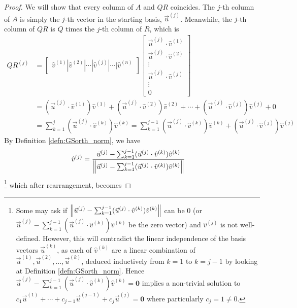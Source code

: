 \begin{proof}
We will show that every column of $A$ and $QR$ coincides. The $j$-th column of $A$ is simply the $j$-th vector in the starting basis, $\vec{u}^{(j)}$. Meanwhile, the $j$-th column of $QR$ is $Q$ times the $j$-th column of $R$, which is
\begin{align*}
QR^{(j)} &=
\begin{bmatrix}
\hat{v}^{(1)}|\hat{v}^{(2)}|\cdots|\hat{v}^{(j)}|\cdots|\hat{v}^{(n)}   
\end{bmatrix}
\begin{bmatrix}
\vec{u}^{(j)} \cdot \hat{v}^{(1)} \\   
\vec{u}^{(j)} \cdot \hat{v}^{(2)} \\   
\vdots \\
\vec{u}^{(j)} \cdot \hat{v}^{(j)} \\
\vdots \\
0
\end{bmatrix} \\
&= (\vec{u}^{(j)} \cdot \hat{v}^{(1)}) \hat{v}^{(1)} + (\vec{u}^{(j)} \cdot \hat{v}^{(2)}) \hat{v}^{(2)} + \cdots + (\vec{u}^{(j)} \cdot \hat{v}^{(j)}) \hat{v}^{(j)} + 0 \\
&= \sum_{k=1}^{j}(\vec{u}^{(j)} \cdot \hat{v}^{(k)})\hat{v}^{(k)} = \sum_{k=1}^{j-1}(\vec{u}^{(j)} \cdot \hat{v}^{(k)})\hat{v}^{(k)} + (\vec{u}^{(j)} \cdot \hat{v}^{(j)})\hat{v}^{(j)}
\end{align*}
By Definition \ref{defn:GSorth_norm}, we have
\begin{align*}
\hat{v}^{(j)} &= \frac{\vec{u}^{(j)} - \sum_{k=1}^{j-1}(\vec{u}^{(j)} \cdot \hat{v}^{(k)})\hat{v}^{(k)}}{\norm{\vec{u}^{(j)} - \sum_{k=1}^{j-1}(\vec{u}^{(j)} \cdot \hat{v}^{(k)})\hat{v}^{(k)}}}
\end{align*}
\footnote{\label{foot:GSnonzero} Some may ask if $\norm{\vec{u}^{(j)} - \sum_{k=1}^{j-1}(\vec{u}^{(j)} \cdot \hat{v}^{(k)})\hat{v}^{(k)}}$ can be $0$ (or $\vec{u}^{(j)} - \sum_{k=1}^{j-1}(\vec{u}^{(j)} \cdot \hat{v}^{(k)})\hat{v}^{(k)}$ be the zero vector) and $\hat{v}^{(j)}$ is not well-defined. However, this will contradict the linear independence of the basis vectors $\vec{u}^{(k)}$, as each of $\hat{v}^{(k)}$ are a linear combination of $\vec{u}^{(1)}, \vec{u}^{(2)}, \ldots, \vec{u}^{(k)}$, deduced inductively from $k = 1$ to $k = j-1$ by looking at Definition \ref{defn:GSorth_norm}. Hence $\vec{u}^{(j)} - \sum_{k=1}^{j-1}(\vec{u}^{(j)} \cdot \hat{v}^{(k)})\hat{v}^{(k)} = \textbf{0}$ implies a non-trivial solution to $c_1 \vec{u}^{(1)} + \cdots + c_{j-1}\vec{u}^{(j-1)} + c_j\vec{u}^{(j)} = \textbf{0}$ where particularly $c_j = 1 \neq 0$.} which after rearrangement, becomes

\end{proof}
